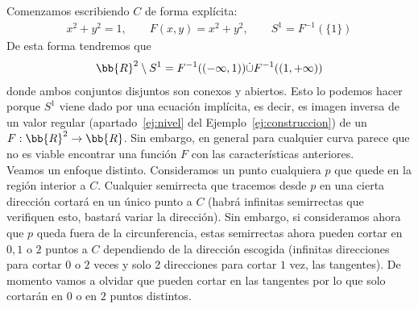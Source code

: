 Comenzamos escribiendo $C$ de forma explícita:
\begin{gather*}
    x^2 + y^2 = 1, \qquad F(x,y) = x^2 + y^2, \qquad S^1 = F^{-1}(\{1\})
\end{gather*}
De esta forma tendremos que 
\begin{gather*}
    \bb{R}^2 \setminus S^1 = F^{-1}((-\infty, 1)) \dot{\cup} F^{-1}((1,+\infty))
\end{gather*}
donde ambos conjuntos disjuntos son conexos y abiertos. Esto lo podemos hacer porque $S^1$ viene dado por una ecuación implícita, es decir, es imagen inversa de un valor regular (apartado~\ref{ej:nivel} del Ejemplo~\ref{ej:construccion}) de un $F:\bb{R}^2 \to \bb{R}$. Sin embargo, en general para cualquier curva parece que no es viable encontrar una función $F$ con las características anteriores.\\

Veamos un enfoque distinto. Consideramos un punto cualquiera $p$ que quede en la región interior a $C$. Cualquier semirrecta que tracemos desde $p$ en una cierta dirección cortará en un único punto a $C$ (habrá infinitas semirrectas que verifiquen esto, bastará variar la dirección). Sin embargo, si consideramos ahora que $p$ queda fuera de la circunferencia, estas semirrectas ahora pueden cortar en $0,1$ o $2$ puntos a $C$ dependiendo de la dirección escogida (infinitas direcciones para cortar $0$ o $2$ veces y solo 2 direcciones para cortar $1$ vez, las tangentes). De momento vamos a olvidar que pueden cortar en las tangentes por lo que solo cortarán en $0$ o en $2$ puntos distintos.

